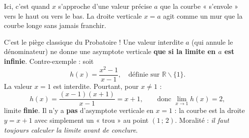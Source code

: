 \documentclass[11pt]{article}
\def\setminus{\mathbin{\backslash}}\let\smallsetminus\setminus
\begin{document}
Ici, c'est quand $x$ s'approche d'une valeur précise $a$ que la courbe « s'envole » vers le haut ou vers le bas. La droite verticale $x = a$ agit comme un mur que la courbe longe sans jamais franchir.

\begin{attention}
C'est le piège classique du Probatoire ! Une valeur interdite $a$ (qui annule le dénominateur) ne donne une asymptote verticale \textbf{que si la limite en $a$ est infinie}. Contre-exemple : soit
\[ h(x) = \frac{x^2 - 1}{x - 1}, \quad \text{définie sur } \mathbb{R} \setminus \{1\}. \]
La valeur $x = 1$ est interdite. Pourtant, pour $x \neq 1$ :
\[ h(x) = \frac{(x-1)(x+1)}{x-1} = x + 1, \qquad \text{donc } \lim_{x \to 1} h(x) = 2, \]
limite \textbf{finie}. Il n'y a \textbf{pas} d'asymptote verticale en $x = 1$ : la courbe est la droite $y = x+1$ avec simplement un « trou » au point $(1\,;\,2)$. Moralité : \emph{il faut toujours calculer la limite avant de conclure}.
\end{attention}
\end{document}
